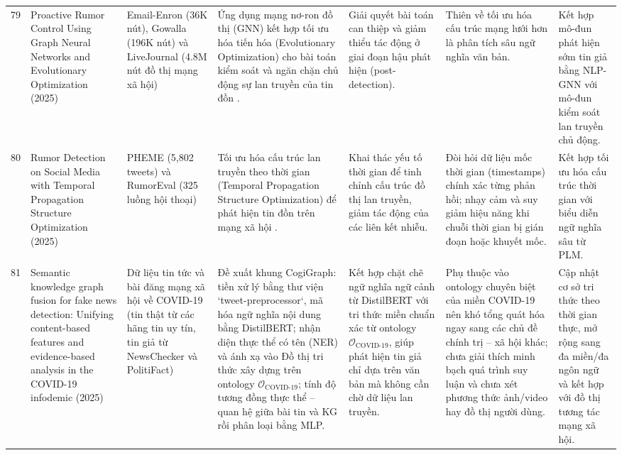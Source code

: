 \documentclass[11pt,a4paper]{extreport}
\begin{document}
\begin{landscape}
\begin{longtable}{@{}C{0.6cm}p{3.6cm}p{2.7cm}p{4.8cm}p{3.6cm}p{3.6cm}p{3.6cm}@{}}
79 & Proactive Rumor Control Using Graph Neural Networks and Evolutionary Optimization (2025) \cite{noauthor_proactive_2025} & Email-Enron (36K nút), Gowalla (196K nút) và LiveJournal (4.8M nút đồ thị mạng xã hội) & Ứng dụng mạng nơ-ron đồ thị (GNN) kết hợp tối ưu hóa tiến hóa (Evolutionary Optimization) cho bài toán kiểm soát và ngăn chặn chủ động sự lan truyền của tin đồn \cite{noauthor_proactive_2025}. & Giải quyết bài toán can thiệp và giảm thiểu tác động ở giai đoạn hậu phát hiện (post-detection). & Thiên về tối ưu hóa cấu trúc mạng lưới hơn là phân tích sâu ngữ nghĩa văn bản. & Kết hợp mô-đun phát hiện sớm tin giả bằng NLP-GNN với mô-đun kiểm soát lan truyền chủ động. \\ 

80 & Rumor Detection on Social Media with Temporal Propagation Structure Optimization (2025) \cite{noauthor_rumor_2025} & PHEME (5,802 tweets) và RumorEval (325 luồng hội thoại) & Tối ưu hóa cấu trúc lan truyền theo thời gian (Temporal Propagation Structure Optimization) để phát hiện tin đồn trên mạng xã hội \cite{noauthor_rumor_2025}. & Khai thác yếu tố thời gian để tinh chỉnh cấu trúc đồ thị lan truyền, giảm tác động của các liên kết nhiễu. & Đòi hỏi dữ liệu mốc thời gian (timestamps) chính xác từng phản hồi; nhạy cảm và suy giảm hiệu năng khi chuỗi thời gian bị gián đoạn hoặc khuyết mốc. & Kết hợp tối ưu hóa cấu trúc thời gian với biểu diễn ngữ nghĩa sâu từ PLM. \\ 

81 & Semantic knowledge graph fusion for fake news detection: Unifying content-based features and evidence-based analysis in the COVID-19 infodemic (2025) \cite{noauthor_semantic_2025} & Dữ liệu tin tức và bài đăng mạng xã hội về COVID-19 (tin thật từ các hãng tin uy tín, tin giả từ NewsChecker và PolitiFact) & Đề xuất khung CogiGraph: tiền xử lý bằng thư viện `tweet-preprocessor`, mã hóa ngữ nghĩa nội dung bằng DistilBERT; nhận diện thực thể có tên (NER) và ánh xạ vào Đồ thị tri thức xây dựng trên ontology $\mathcal{O}_{\text{COVID-19}}$; tính độ tương đồng thực thể -- quan hệ giữa bài tin và KG rồi phân loại bằng MLP. & Kết hợp chặt chẽ ngữ nghĩa ngữ cảnh từ DistilBERT với tri thức miền chuẩn xác từ ontology $\mathcal{O}_{\text{COVID-19}}$, giúp phát hiện tin giả chỉ dựa trên văn bản mà không cần chờ dữ liệu lan truyền. & Phụ thuộc vào ontology chuyên biệt của miền COVID-19 nên khó tổng quát hóa ngay sang các chủ đề chính trị -- xã hội khác; chưa giải thích minh bạch quá trình suy luận và chưa xét phương thức ảnh/video hay đồ thị người dùng. & Cập nhật cơ sở tri thức theo thời gian thực, mở rộng sang đa miền/đa ngôn ngữ và kết hợp với đồ thị tương tác mạng xã hội. \\ 


\end{longtable}
\end{landscape}
\end{document}
